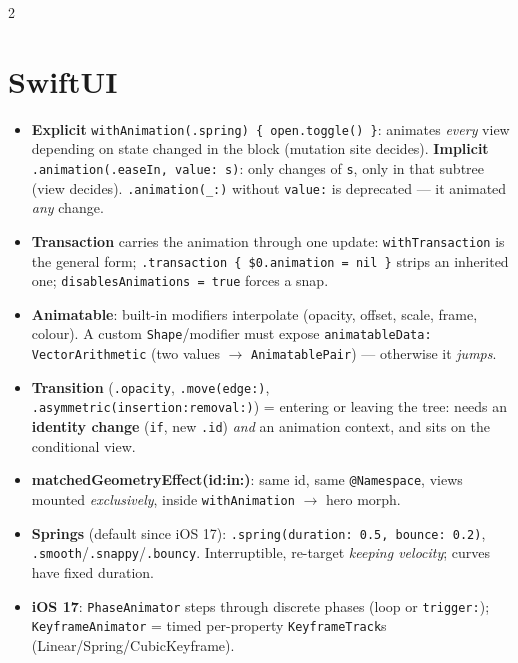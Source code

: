 \documentclass[8pt]{extarticle}
\begin{document}



\begin{multicols}{2}
\raggedright

\section{SwiftUI}
\begin{itemize}
  \item \textbf{Explicit} \texttt{withAnimation(.spring) \{ open.toggle() \}}:
        animates \emph{every} view depending on state changed in the block
        (mutation site decides). \textbf{Implicit}
        \texttt{.animation(.easeIn, value: s)}: only changes of \texttt{s}, only
        in that subtree (view decides). \texttt{.animation(\_:)} without
        \texttt{value:} is deprecated — it animated \emph{any} change.
  \item \textbf{Transaction} carries the animation through one update:
        \texttt{withTransaction} is the general form;
        \texttt{.transaction \{ \$0.animation = nil \}} strips an inherited one;
        \texttt{disablesAnimations = true} forces a snap.
  \item \textbf{Animatable}: built-in modifiers interpolate (opacity, offset,
        scale, frame, colour). A custom \texttt{Shape}/modifier must expose
        \texttt{animatableData: VectorArithmetic} (two values $\to$
        \texttt{AnimatablePair}) — otherwise it \emph{jumps}.
  \item \textbf{Transition} (\texttt{.opacity}, \texttt{.move(edge:)}, \\
        \texttt{.asymmetric(insertion:removal:)}) = entering or leaving the tree:
        needs an \textbf{identity change} (\texttt{if}, new \texttt{.id}) \emph{and}
        an animation context, and sits on the conditional view.
  \item \textbf{matchedGeometryEffect(id:in:)}: same id, same
        \texttt{@Namespace}, views mounted \emph{exclusively}, inside
        \texttt{withAnimation} $\to$ hero morph.
  \item \textbf{Springs} (default since iOS 17): \texttt{.spring(duration: 0.5,
        bounce: 0.2)}, \texttt{.smooth}/\texttt{.snappy}/\texttt{.bouncy}.
        Interruptible, re-target \emph{keeping velocity}; curves have fixed duration.
  \item \textbf{iOS 17}: \texttt{PhaseAnimator} steps through discrete phases
        (loop or \texttt{trigger:}); \texttt{KeyframeAnimator} = timed
        per-property \texttt{KeyframeTrack}s (Linear/Spring/Cubic\-Keyframe).
\end{itemize}


\end{multicols}
\end{document}
